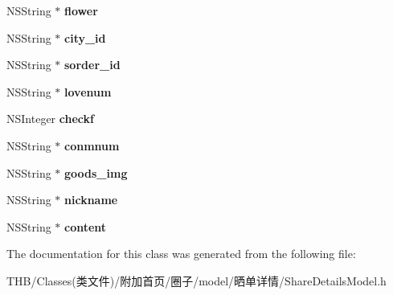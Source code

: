 \begin{DoxyCompactItemize}
N\+S\+String $\ast$ {\bfseries flower}
\item 
\mbox{\label{interface_share_details_model_a0cee39c90b8bda7d541796f3898d3f92}} 
N\+S\+String $\ast$ {\bfseries city\+\_\+id}
\item 
\mbox{\label{interface_share_details_model_a033c3a51c8217455fd3482714b822b4c}} 
N\+S\+String $\ast$ {\bfseries sorder\+\_\+id}
\item 
\mbox{\label{interface_share_details_model_a081121cd2627c7d260bf279abaabb66b}} 
N\+S\+String $\ast$ {\bfseries lovenum}
\item 
\mbox{\label{interface_share_details_model_ac5269c3bc09105173425cc09c81c05ac}} 
N\+S\+Integer {\bfseries checkf}
\item 
\mbox{\label{interface_share_details_model_a53a8629fc9d84c7c0a23175cfe1a9a46}} 
N\+S\+String $\ast$ {\bfseries conmnum}
\item 
\mbox{\label{interface_share_details_model_afae0da5ab0f1548c37c6b7299659ac95}} 
N\+S\+String $\ast$ {\bfseries goods\+\_\+img}
\item 
\mbox{\label{interface_share_details_model_a3bf64d9e1137b7cb1c273fa04f9d606d}} 
N\+S\+String $\ast$ {\bfseries nickname}
\item 
\mbox{\label{interface_share_details_model_afd9da785842b53beef9fd46b91c0599f}} 
N\+S\+String $\ast$ {\bfseries content}
\end{DoxyCompactItemize}


The documentation for this class was generated from the following file\+:\begin{DoxyCompactItemize}
\item 
T\+H\+B/\+Classes(类文件)/附加首页/圈子/model/晒单详情/Share\+Details\+Model.\+h\end{DoxyCompactItemize}
